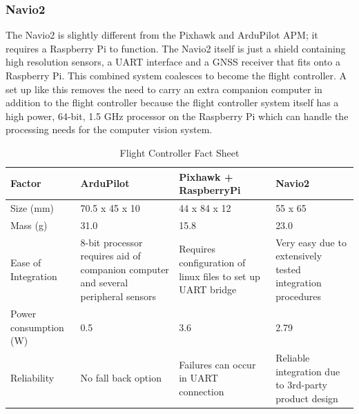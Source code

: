		\subsubsection{Navio2}
			The Navio2 is slightly different from the Pixhawk and ArduPilot APM; it requires a Raspberry Pi to function. The Navio2 itself is just a shield containing high resolution sensors, a UART interface and a GNSS receiver that fits onto a Raspberry Pi. This combined system coalesces to become the flight controller. A set up like this removes the need to carry an extra companion computer in addition to the flight controller because the flight controller system itself has a high power, 64-bit, 1.5 GHz processor on the Raspberry Pi which can handle the processing needs for the computer vision system.

		\begin{table}[H]
			\centering
			\caption{Flight Controller Fact Sheet}
			\label{tab: flight controller}
			\begin{tabularx}{1\linewidth}{X X X X}
				\toprule
				Factor & ArduPilot & Pixhawk + RaspberryPi & Navio2 \\
			   \midrule
			   	Size (mm) & 70.5 x 45 x 10 & 44 x 84 x 12 & 55 x 65 \\
				Mass (g) & 31.0 & 15.8 & 23.0 \\
				Ease of Integration & 8-bit processor requires aid of companion \mbox{computer} and several peripheral sensors & Requires configuration of linux files to set up UART bridge & Very easy due to extensively tested integration procedures\\
				Power \newline consumption (W) & 0.5 & 3.6 & 2.79 \\
				Reliability & No fall back option & Failures can occur in UART connection & Reliable integration due to 3rd-party product \mbox{design} \\
				\bottomrule
			\end{tabularx}
		\end{table}
